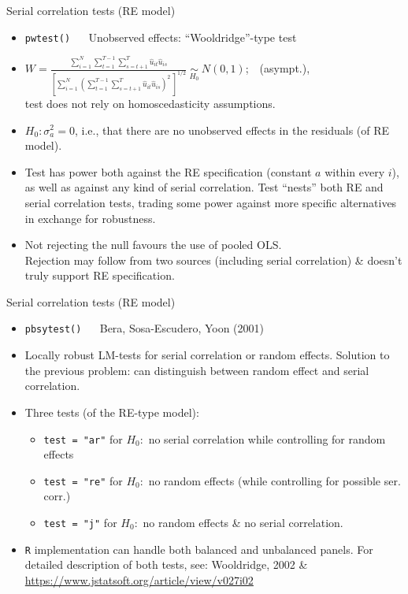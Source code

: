 \documentclass[usenames,dvipsnames]{beamer}
\begin{document}
\begin{frame}{Serial correlation tests (RE model)}
\small 
\vspace{-0.2cm}
\begin{itemize}
    \item \texttt{pwtest()} ~~ Unobserved effects: ``Wooldridge''-type test
    \smallskip 
    \item $W = \frac{\displaystyle\sum_{i=1}^N 
        \displaystyle\sum_{t=1}^{T-1}
        \displaystyle\sum_{s=t+1}^T \hat{u}_{it}\hat{u}_{is}}
        {\left[\displaystyle\sum_{i=1}^N \left(
        \displaystyle\sum_{t=1}^{T-1}
        \displaystyle\sum_{s=t+1}^T \hat{u}_{it}\hat{u}_{is}
        \right)^{\!2}~ \right]^{1/2}}~
        \underset{H_0}{\sim}~ N(0,1)$;~~(asympt.), \\test does not rely on homoscedasticity assumptions.
    \medskip
    \item $H_0: \sigma_{a}^2 = 0$, i.e., that there are no unobserved effects in the residuals (of RE model).
    \item Test has power both against the RE specification (constant $a$ within every $i$), as well as against any kind of serial correlation. Test ``nests'' both RE and serial correlation tests, trading some power against more specific alternatives in exchange for robustness.
    \item Not rejecting the null favours the use of pooled OLS.\\Rejection may follow from two sources (including serial correlation) \& doesn't truly support RE specification.
\end{itemize}
\end{frame}
\begin{frame}{Serial correlation tests (RE model)}
\small 
\begin{itemize}
    \item \texttt{pbsytest()} ~~ Bera, Sosa-Escudero, Yoon (2001)
    \medskip
    \item Locally robust LM-tests for serial correlation or random effects. Solution to the previous problem: can distinguish between random effect and serial correlation. 
    \medskip
    \item Three tests (of the RE-type model):\\ \smallskip
    \begin{itemize}
        \item \texttt{test = "ar"}  for $H_0:$ no serial correlation while controlling for random effects
        \smallskip
        \item \texttt{test = "re"} for $H_0:$ no random effects (while controlling for possible ser. corr.)
        \smallskip
        \item \texttt{test = "j"} for $H_0:$ no random effects \& no serial correlation.
    \end{itemize}
        \bigskip
        \item \texttt{R} implementation can handle both balanced and unbalanced panels. For detailed description of both tests, see:  Wooldridge, 2002 \& \url{https://www.jstatsoft.org/article/view/v027i02}
\end{itemize}
\end{frame}
\end{document}
